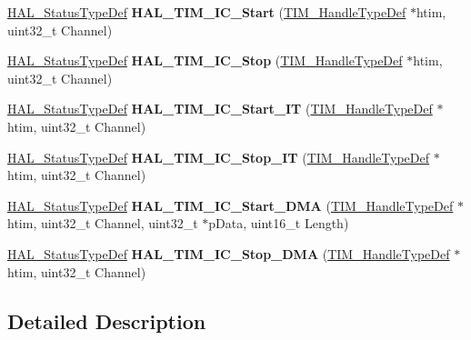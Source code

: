 \begin{DoxyCompactItemize}
\mbox{\hyperlink{stm32f4xx__hal__def_8h_a63c0679d1cb8b8c684fbb0632743478f}{H\+A\+L\+\_\+\+Status\+Type\+Def}} {\bfseries H\+A\+L\+\_\+\+T\+I\+M\+\_\+\+I\+C\+\_\+\+Start} (\mbox{\hyperlink{struct_t_i_m___handle_type_def}{T\+I\+M\+\_\+\+Handle\+Type\+Def}} $\ast$htim, uint32\+\_\+t Channel)
\item 
\mbox{\label{group___t_i_m___exported___functions___group4_ga1b5edb103cb27dbd5380e9b24d12658f}} 
\mbox{\hyperlink{stm32f4xx__hal__def_8h_a63c0679d1cb8b8c684fbb0632743478f}{H\+A\+L\+\_\+\+Status\+Type\+Def}} {\bfseries H\+A\+L\+\_\+\+T\+I\+M\+\_\+\+I\+C\+\_\+\+Stop} (\mbox{\hyperlink{struct_t_i_m___handle_type_def}{T\+I\+M\+\_\+\+Handle\+Type\+Def}} $\ast$htim, uint32\+\_\+t Channel)
\item 
\mbox{\label{group___t_i_m___exported___functions___group4_gac0e3515f374ec6b9d30609cd683649d6}} 
\mbox{\hyperlink{stm32f4xx__hal__def_8h_a63c0679d1cb8b8c684fbb0632743478f}{H\+A\+L\+\_\+\+Status\+Type\+Def}} {\bfseries H\+A\+L\+\_\+\+T\+I\+M\+\_\+\+I\+C\+\_\+\+Start\+\_\+\+IT} (\mbox{\hyperlink{struct_t_i_m___handle_type_def}{T\+I\+M\+\_\+\+Handle\+Type\+Def}} $\ast$htim, uint32\+\_\+t Channel)
\item 
\mbox{\label{group___t_i_m___exported___functions___group4_gaf5664e207667c99ef50378813056e5f6}} 
\mbox{\hyperlink{stm32f4xx__hal__def_8h_a63c0679d1cb8b8c684fbb0632743478f}{H\+A\+L\+\_\+\+Status\+Type\+Def}} {\bfseries H\+A\+L\+\_\+\+T\+I\+M\+\_\+\+I\+C\+\_\+\+Stop\+\_\+\+IT} (\mbox{\hyperlink{struct_t_i_m___handle_type_def}{T\+I\+M\+\_\+\+Handle\+Type\+Def}} $\ast$htim, uint32\+\_\+t Channel)
\item 
\mbox{\label{group___t_i_m___exported___functions___group4_gac3b7deffff43a8bdc3e2eea42115efff}} 
\mbox{\hyperlink{stm32f4xx__hal__def_8h_a63c0679d1cb8b8c684fbb0632743478f}{H\+A\+L\+\_\+\+Status\+Type\+Def}} {\bfseries H\+A\+L\+\_\+\+T\+I\+M\+\_\+\+I\+C\+\_\+\+Start\+\_\+\+D\+MA} (\mbox{\hyperlink{struct_t_i_m___handle_type_def}{T\+I\+M\+\_\+\+Handle\+Type\+Def}} $\ast$htim, uint32\+\_\+t Channel, uint32\+\_\+t $\ast$p\+Data, uint16\+\_\+t Length)
\item 
\mbox{\label{group___t_i_m___exported___functions___group4_ga8e7dc17f058ef9c826774436d68f80b5}} 
\mbox{\hyperlink{stm32f4xx__hal__def_8h_a63c0679d1cb8b8c684fbb0632743478f}{H\+A\+L\+\_\+\+Status\+Type\+Def}} {\bfseries H\+A\+L\+\_\+\+T\+I\+M\+\_\+\+I\+C\+\_\+\+Stop\+\_\+\+D\+MA} (\mbox{\hyperlink{struct_t_i_m___handle_type_def}{T\+I\+M\+\_\+\+Handle\+Type\+Def}} $\ast$htim, uint32\+\_\+t Channel)
\end{DoxyCompactItemize}


\subsection{Detailed Description}
